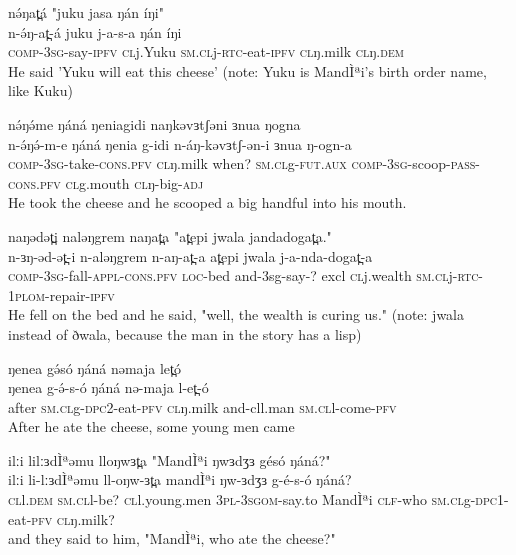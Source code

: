 \ex nə́ŋat̪á "juku jasa ŋán íŋi" 	  \\ 
	\gll  n-ə́ŋ-at̪-á juku j-a-s-a ŋán íŋi\\	
		  \textsc{comp-3sg}-say-\textsc{ipfv} \textsc{cl}j.Yuku \textsc{sm.cl}j-\textsc{rtc}-eat-\textsc{ipfv} \textsc{cl}ŋ.milk \textsc{cl}ŋ.\textsc{dem} \\
		 \glt He said 'Yuku will eat this cheese' (note: Yuku is MandÌªi's birth order name, like Kuku)
		 
		  
\ex  nə́ŋə́me ŋáná ŋeniagidi naŋkəvɜtʃəni ɜnua ŋogna	  \\ 
	\gll  n-ə́ŋə́-m-e ŋáná ŋenia g-idi n-áŋ-kəvɜtʃ-ən-i ɜnua ŋ-ogn-a\\	
		  \textsc{comp-3sg}-take-\textsc{cons.pfv} \textsc{cl}ŋ.milk when? \textsc{sm.cl}g-\textsc{fut.aux} \textsc{comp-3sg}-scoop-\textsc{pass-cons.pfv} \textsc{cl}g.mouth \textsc{cl}ŋ-big-\textsc{adj}    \\
		 \glt He took the cheese and he scooped a big handful into his mouth. 
		  
\ex  naŋədət̪i naləŋgrem naŋat̪a "at̪epi jwala jandadogat̪a."  \\ 
	\gll  n-ɜŋ-əd-ət̪-i n-aləŋgrem n-aŋ-at̪-a at̪epi jwala j-a-nda-dogat̪-a\\	
		  \textsc{comp-3sg}-fall-\textsc{appl-cons.pfv} \textsc{loc}-bed and-3sg-say-? excl \textsc{cl}j.wealth \textsc{sm.cl}j-\textsc{rtc-1plom}-repair-\textsc{ipfv}  \\
		 \glt He fell on the bed and he said, "well, the wealth is curing us." 
(note: jwala instead of ðwala, because the man in the story has a lisp) 
 
		  
\ex  ŋenea gə́só ŋáná nəmaja let̪ó \\ 
	\gll  ŋenea g-ə́-s-ó ŋáná nə-maja l-et̪-ó \\	
		  after \textsc{sm.cl}g-\textsc{dpc2}-eat-\textsc{pfv} \textsc{cl}ŋ.milk and-{cl}l.man \textsc{sm.cl}l-come-\textsc{pfv}\\ 		 
		  \glt After he ate the cheese, some young men came 
	  
\ex		  ilːi lilːɜdÌªəmu lloŋwɜt̪a "MandÌªi ŋwɜdʒɜ gésó ŋáná?"\\
	\gll	ilːi li-lːɜdÌªəmu ll-oŋw-ɜt̪a mandÌªi ŋw-ɜdʒɜ g-é-s-ó ŋáná?\\
	\textsc{cl}l.\textsc{dem} \textsc{sm.cl}l-be? \textsc{cl}l.young.men \textsc{3pl-3sgom}-say.to MandÌªi \textsc{clf}-who \textsc{sm.cl}g-\textsc{dpc1}-eat-\textsc{pfv} \textsc{cl}ŋ.milk?\\
	\glt and they said to him, "MandÌªi, who ate the cheese?" 
	
